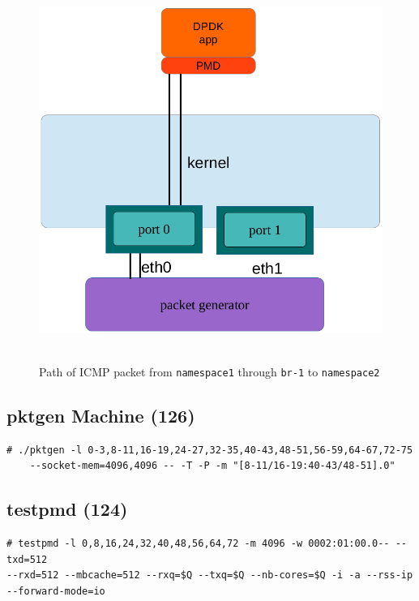 \documentclass[letter]{article}
\begin{document}
{{{\begin{figure}[H]
\caption{Path of ICMP packet from \texttt{namespace1} through \texttt{br-1} to \texttt{namespace2}}
\hbox{\hspace{-0.5cm} \includegraphics{i-o-1-port} }
\end{figure}

\subsection{pktgen Machine (126)}

\begin{lstlisting}
# ./pktgen -l 0-3,8-11,16-19,24-27,32-35,40-43,48-51,56-59,64-67,72-75 
	--socket-mem=4096,4096 -- -T -P -m "[8-11/16-19:40-43/48-51].0"
\end{lstlisting}

\subsection{testpmd (124)}

\begin{lstlisting}[escapechar=!]
# testpmd -l 0,8,16,24,32,40,48,56,64,72 -m 4096 -w 0002:01:00.0-- --txd=512 
--rxd=512 --mbcache=512 --rxq=$Q --txq=$Q --nb-cores=$Q -i -a --rss-ip --forward-mode=io
\end{lstlisting}

}}}
\end{document}
